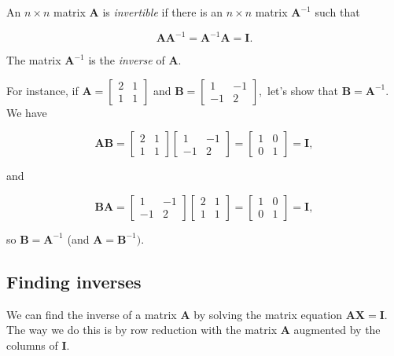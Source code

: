 \documentclass[
]{book}
\theoremstyle{definition}
\theoremstyle{definition}
\theoremstyle{definition}
\theoremstyle{definition}
\theoremstyle{remark}
\begin{document}
An \(n\times n\) matrix \(\mathbf{A}\) is \emph{invertible} if there is an \(n\times n\) matrix \(\mathbf{A}^{-1}\) such that

\[\mathbf{A}\mathbf{A}^{-1}=\mathbf{A}^{-1}\mathbf{A}=\mathbf{I}.\]

The matrix \(\mathbf{A}^{-1}\) is the \emph{inverse} of \(\mathbf{A}\).

For instance, if \(\displaystyle{\mathbf{A}=\begin{bmatrix}
2 & 1\\1 & 1
\end{bmatrix}}\) and \(\mathbf{B}=\displaystyle{\begin{bmatrix}
1 & -1\\-1 & 2
\end{bmatrix}},\) let's show that \(\mathbf{B}=\mathbf{A}^{-1}.\) We have

\[\mathbf{AB}=\begin{bmatrix}
2 & 1\\1 & 1
\end{bmatrix}\begin{bmatrix}
1 & -1\\-1 & 2
\end{bmatrix}=\begin{bmatrix}
1 & 0 \\0 & 1
\end{bmatrix}=\mathbf{I},\]

and

\[\mathbf{BA}=\begin{bmatrix}
1 & -1\\-1 & 2
\end{bmatrix}\begin{bmatrix}
2 & 1\\1 & 1
\end{bmatrix}=\begin{bmatrix}
1 & 0 \\0 & 1
\end{bmatrix}=\mathbf{I},\]

so \(\mathbf{B}=\mathbf{A}^{-1}\) (and \(\mathbf{A}=\mathbf{B}^{-1})\).

\subsection*{Finding inverses}\label{finding-inverses}

We can find the inverse of a matrix \(\mathbf{A}\) by solving the matrix equation \(\mathbf{AX}=\mathbf{I}\). The way we do this is by row reduction with the matrix \(\mathbf{A}\) augmented by the columns of \(\mathbf{I}\).
\end{document}
